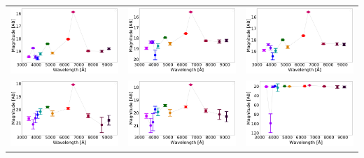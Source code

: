 \begin{table}
\begin{tabular}{ccc}
\includegraphics[width=0.3\linewidth, clip]{photopectrum_splus_MC0115-229578_aper.pdf} & \includegraphics[width=0.3\linewidth, clip]{photopectrum_splus_MC0115-229578_auto.pdf} & \includegraphics[width=0.3\linewidth, clip]{photopectrum_splus_MC0115-229578_petro.pdf} \\
\includegraphics[width=0.3\linewidth, clip]{photopectrum_splus_MC0115-308119_aper.pdf} & \includegraphics[width=0.3\linewidth, clip]{photopectrum_splus_MC0115-308119_auto.pdf} & \includegraphics[width=0.3\linewidth, clip]{photopectrum_splus_MC0115-308119_petro.pdf} \\

\end{tabular}
\end{table}
